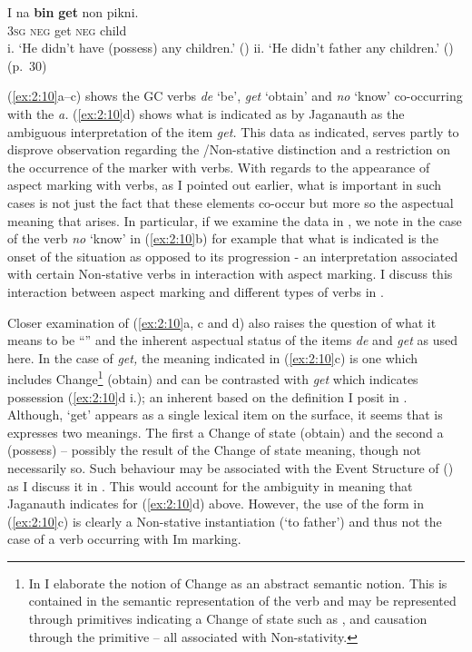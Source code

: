 \ex
    \gll I na \textbf{bin}     \textbf{get} non   pikni.\\
\textsc{3sg} \textsc{neg} {\TNS}   get  \textsc{neg} child\\
\glt i. `He didn’t have (possess) any children.' (\STATIVE) 
\glt ii. `He didn’t father any children.' (\DYNAMIC) (p.~30) \z \z

(\ref{ex:2:10}a--c) shows the GC  verbs
\textit{de} `be’, \textit{get} `obtain' and \textit{no} `know'
co-oc\-cur\-ring with the   \textit{a.}
(\ref{ex:2:10}d) shows what is indicated as by Jaganauth as the
ambiguous interpretation of the item \textit{get.}  This data as
indicated, serves partly to disprove 
observation regarding the \slash Non-stative distinction and a
restriction on the occurrence of the  marker with 
verbs.  With regards to the appearance of  aspect marking
with  verbs, as I pointed out earlier, what is important in such
cases is not just the fact that these elements co-occur but more so
the aspectual meaning that arises.  In particular, if we examine the
data in , we note in the case of the verb \textit{no}
`know' in (\ref{ex:2:10}b) for example that what is indicated is the
onset of the situation as opposed to its progression - an
interpretation associated with certain Non-stative verbs in
interaction with  aspect marking.  I discuss this
interaction between  aspect marking and different types of
verbs in .

Closer examination of (\ref{ex:2:10}a, c and d) also raises the
question of what it means to be ``'' and the inherent aspectual
status of the items \textit{de} and \textit{get} as used here.  In the
case of \textit{get,} the meaning indicated in (\ref{ex:2:10}c) is one
which includes Change\footnote{In  I elaborate the notion
  of Change as an abstract semantic notion. This is contained in the
  semantic representation of the verb and may be represented through
  primitives indicating a Change of state such as \BECOME, and
  causation through the primitive {\CAUSE} -- all associated with
  Non-stativity.}  (obtain) and can be contrasted with \textit{get}
which indicates possession (\ref{ex:2:10}d i.); an inherent  based on the
definition I posit in .  Although, `get' appears as a
single lexical item on the surface, it seems that is expresses two
meanings.  The first a Change of state (obtain) and the second a 
(possess) -- possibly the result of the Change of state meaning, though
not necessarily so.  Such behaviour may be associated with the Event
Structure of  (\citealt{Pustejovsky1988,Pustejovsky1991}) 
as I discuss it in .  This would account for the 
ambiguity in meaning that Jaganauth indicates for (\ref{ex:2:10}d) above.
However, the use of the form in (\ref{ex:2:10}c) is clearly a Non-stative instantiation (`to father') and thus not the case of a  
verb occurring with Im marking.

